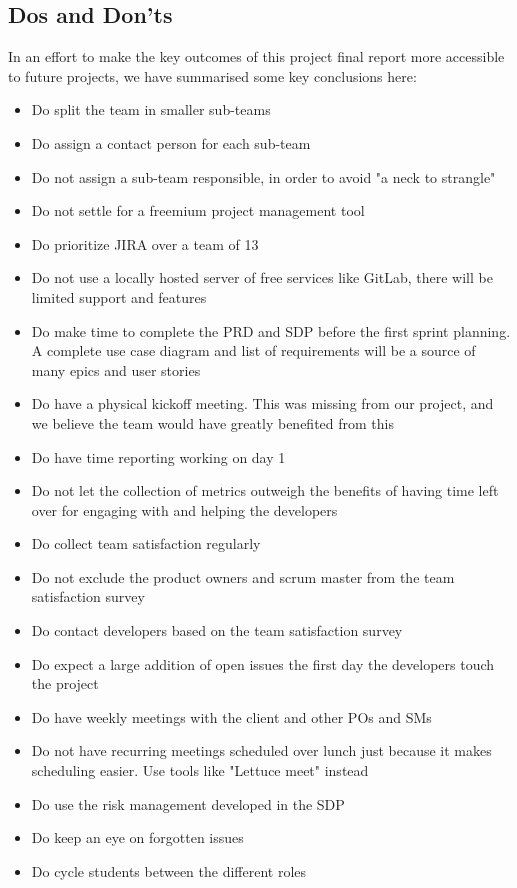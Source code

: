 \documentclass{article}
\begin{document}
\subsection{Dos and Don'ts}
In an effort to make the key outcomes of this project final report more accessible to future projects, we have summarised some key conclusions here:

\begin{itemize}
    \item Do split the team in smaller sub-teams
    \item Do assign a contact person for each sub-team
    \item Do not assign a sub-team responsible, in order to avoid "a neck to strangle"
    \item Do not settle for a freemium project management tool
    \item Do prioritize JIRA over a team of 13
    \item Do not use a locally hosted server of free services like GitLab, there will be limited support and features
    \item Do make time to complete the PRD and SDP before the first sprint planning. A complete use case diagram and list of requirements will be a source of many epics and user stories
    \item Do have a physical kickoff meeting. This was missing from our project, and we believe the team would have greatly benefited from this
    \item Do have time reporting working on day 1
    \item Do not let the collection of metrics outweigh the benefits of having time left over for engaging with and helping the developers
    \item Do collect team satisfaction regularly
    \item Do not exclude the product owners and scrum master from the team satisfaction survey
    \item Do contact developers based on the team satisfaction survey
    \item Do expect a large addition of open issues the first day the developers touch the project
    \item Do have weekly meetings with the client and other POs and SMs
    \item Do not have recurring meetings scheduled over lunch just because it makes scheduling easier. Use tools like "Lettuce meet" instead
    \item Do use the risk management developed in the SDP
    \item Do keep an eye on forgotten issues
    \item Do cycle students between the different roles
\end{itemize}
\end{document}

